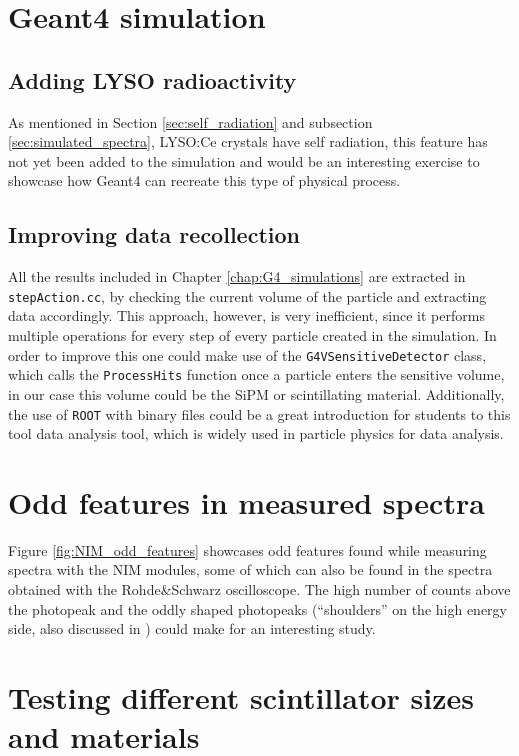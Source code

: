\section{Geant4 simulation}

\subsection{Adding LYSO radioactivity}

As mentioned in Section \ref{sec:self_radiation} and subsection \ref{sec:simulated_spectra}, LYSO:Ce crystals have self radiation, this feature has not yet been added to the simulation and would be an interesting exercise to showcase how Geant4 can recreate this type of physical process.

\subsection{Improving data recollection}

All the results included in Chapter \ref{chap:G4_simulations} are extracted in \texttt{stepAction.cc}, by checking the current volume of the particle and extracting data accordingly. This approach, however, is very inefficient, since it performs multiple operations for every step of every particle created in the simulation. In order to improve this one could make use of the \texttt{G4VSensitiveDetector} class, which calls the \texttt{ProcessHits} function once a particle enters the sensitive volume, in our case this volume could be the SiPM or scintillating material. Additionally, the use of \texttt{ROOT} with binary files could be a great introduction for students to this tool data analysis tool, which is widely used in particle physics for data analysis.

\section{Odd features in measured spectra}

Figure \ref{fig:NIM_odd_features} showcases odd features found while measuring spectra with the NIM modules, some of which can also be found in the spectra obtained with the Rohde\&Schwarz oscilloscope. The high number of counts above the photopeak and the oddly shaped photopeaks (``shoulders'' on the high energy side, also discussed in \cite{peak_shoulders}) could make for an interesting study.

\section{Testing different scintillator sizes and materials}

